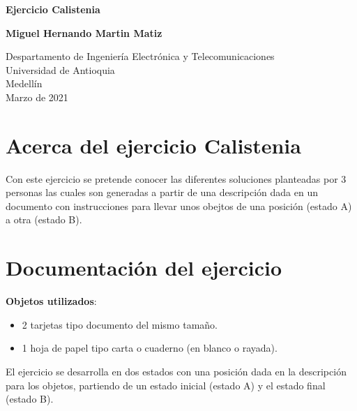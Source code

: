 \documentclass{article}
\begin{document}
\begin{titlepage}
    \begin{center}
        \vspace*{1cm}
            
        \Huge
        \textbf{Ejercicio Calistenia}
            
        \vspace{0.5cm}
        \LARGE
            
        \vspace{1.5cm}
            
        \textbf{Miguel Hernando Martin Matiz}
            
        \vfill
            
        \vspace{0.8cm}
            
        \Large
        Despartamento de Ingeniería Electrónica y Telecomunicaciones\\
        Universidad de Antioquia\\
        Medellín\\
        Marzo de 2021
            
    \end{center}
\end{titlepage}

\tableofcontents
\newpage
\section{Acerca del ejercicio Calistenia}\label{intro}
Con este ejercicio se pretende conocer las diferentes soluciones planteadas por 3 personas las cuales son generadas a partir de una descripción dada en un documento con instrucciones para llevar unos obejtos de una posición (estado A) a otra (estado B).

\section{Documentación del ejercicio} \label{contenido}

\vspace{0.3cm}
\textbf{Objetos utilizados}: 

\begin{itemize}
\item 2 tarjetas tipo documento del mismo tamaño.
\item 1 hoja de papel tipo carta o cuaderno (en blanco o rayada).
\end{itemize}
\vspace{0.3cm}
El ejercicio se desarrolla en dos estados con una posición dada en la descripción para los objetos, partiendo de un estado inicial (estado A) y el estado final (estado B).
\end{document}
